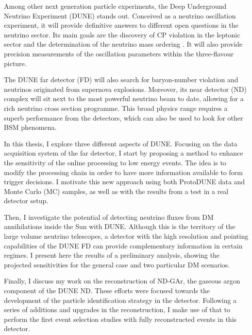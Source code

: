 Among other next generation particle experiments, the Deep Underground Neutrino Experiment (DUNE) stands out. Conceived as a neutrino oscillation experiment, it will provide definitive answers to different open questions in the neutrino sector. Its main goals are the discovery of CP violation in the leptonic sector and the determination of the neutrino mass ordering \cite{DUNE2020TDR1}. It will also provide precision measurements of the oscillation parameters within the three-flavour picture.

The DUNE far detector (FD) will also search for baryon-number violation and neutrinos originated from supernova explosions. Moreover, its near detector (ND) complex will sit next to the most powerful neutrino beam to date, allowing for a rich neutrino cross section programme. This broad physics range requires a superb performance from the detectors, which can also be used to look for other BSM phenomena.

In this thesis, I explore three different aspects of DUNE. Focusing on the data acquisition system of the far detector, I start by proposing a method to enhance the sensitivity of the online processing to low energy events. The idea is to modify the processing chain in order to have more information available to form trigger decisions. I motivate this new approach using both ProtoDUNE data and Monte Carlo (MC) samples, as well as with the results from a test in a real detector setup.

Then, I investigate the potential of detecting neutrino fluxes from DM annihilations inside the Sun with DUNE. Although this is the territory of the large volume neutrino telescopes, a detector with the high resolution and pointing capabilities of the DUNE FD can provide complementary information in certain regimes. I present here the results of a preliminary analysis, showing the projected sensitivities for the general case and two particular DM scenarios.

Finally, I discuss my work on the reconstruction of ND-GAr, the gaseous argon component of the DUNE ND. These efforts were focused towards the development of the particle identification strategy in the detector. Following a series of additions and upgrades in the reconstruction, I make use of that to perform the first event selection studies with fully reconstructed events in this detector.

